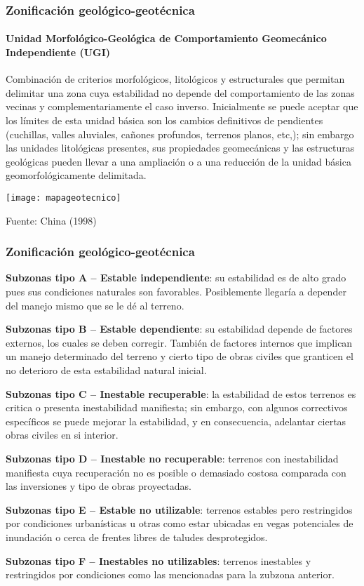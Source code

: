 \documentclass{beamer}
\begin{document}
\begin{frame}
\frametitle{Zonificación geológico-geotécnica}
\framesubtitle{Unidad Morfológico-Geológica de Comportamiento Geomecánico Independiente (UGI)}
\small{Combinación de criterios morfológicos, litológicos y estructurales que permitan delimitar una zona cuya estabilidad no depende del comportamiento de las zonas vecinas y complementariamente el caso inverso. Inicialmente se puede aceptar que los límites de esta unidad básica son los cambios definitivos de pendientes (cuchillas, valles aluviales, cañones profundos, terrenos planos, etc,); sin embargo las unidades litológicas presentes, sus propiedades geomecánicas y las estructuras geológicas pueden llevar a una ampliación o a una reducción de la unidad básica geomorfológicamente delimitada.}
\begin{center}
   	\texttt{[image: mapageotecnico]}
\end{center}
\tiny{Fuente: China (1998)}
\end{frame}
\begin{frame}
\frametitle{Zonificación geológico-geotécnica}
\justifying
\begin{itemize}
\small{
\item \textbf{Subzonas tipo A – Estable independiente}: su estabilidad es de alto grado pues sus condiciones naturales son favorables. Posiblemente llegaría a depender del manejo mismo que se le dé al terreno.
\item \textbf{Subzonas tipo B – Estable dependiente}: su estabilidad depende de factores externos, los cuales se deben corregir. También de factores internos que implican un manejo determinado del terreno y cierto tipo de obras civiles que granticen el no deterioro de esta estabilidad natural inicial.
\item \textbf{Subzonas tipo C – Inestable recuperable}: la estabilidad de estos terrenos es critica o presenta inestabilidad manifiesta; sin embargo, con algunos correctivos específicos se puede mejorar la estabilidad, y en consecuencia, adelantar ciertas obras civiles en si interior.
\item \textbf{Subzonas tipo D – Inestable no recuperable}: terrenos con inestabilidad manifiesta cuya recuperación no es posible o demasiado costosa comparada con las inversiones y tipo de obras proyectadas.
\item \textbf{Subzonas tipo E – Estable no utilizable}: terrenos estables pero restringidos por condiciones urbanísticas u otras como estar ubicadas en vegas potenciales de inundación o cerca de frentes libres de taludes desprotegidos.
\item \textbf{Subzonas tipo F – Inestables no utilizables}: terrenos inestables y restringidos por condiciones como las mencionadas para la zubzona anterior.
}
\end{itemize}
\end{frame}
\end{document}
